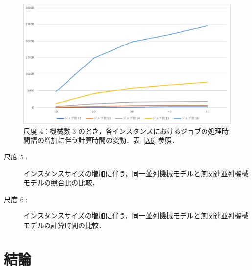 \documentclass[12pt]{optlab-bachelor}
\begin{document}
\begin{figure}[h]
  \centering
  \includegraphics[width = 16cm]{figure/ptTimeId2.pdf}
  \caption{尺度 4：機械数 3 のとき，各インスタンスにおけるジョブの処理時間幅の増加に伴う計算時間の変動．表~\ref{A6} 参照．}
  \label{5.5}
\end{figure}


\begin{description}
  \item[尺度 5 :] インスタンスサイズの増加に伴う，同一並列機械モデルと無関連並列機械モデルの競合比の比較．
\end{description}


\begin{description}
  \item[尺度 6 :] インスタンスサイズの増加に伴う，同一並列機械モデルと無関連並列機械モデルの計算時間の比較．
\end{description}


\chapter{結論}\label{c_6}
\end{document}
